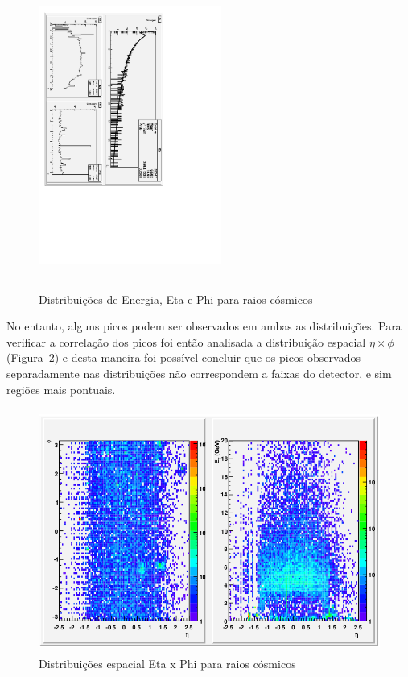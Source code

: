 \documentclass[a4paper,10pt,titlepage]{article}
\begin{document}
\begin{figure}[htbp!]
 \centering
 \includegraphics[width=6cm,height=10cm, angle=90]{Figs/cosmics/rc_fit.pdf}
 \caption{Distribuições de Energia, Eta e Phi para raios cósmicos}
 \label{fig:rc_fit}
\end{figure}

No entanto, alguns picos podem ser observados em ambas as distribuições.
Para verificar a correlação dos picos foi então analisada a distribuição espacial $\eta \times \phi $ (Figura~\ref{fig:rc_eta_phi}) e desta maneira foi possível concluir que os picos observados separadamente nas distribuições não correspondem a faixas do detector, e sim regiões mais pontuais.

\begin{figure}[htbp!]
 \centering
 \includegraphics[width=12cm,height=8cm]{Figs/cosmics/rc_eta_phi.png}
 \caption{Distribuições espacial Eta x Phi para raios cósmicos}
 \label{fig:rc_eta_phi}
\end{figure}
\end{document}
